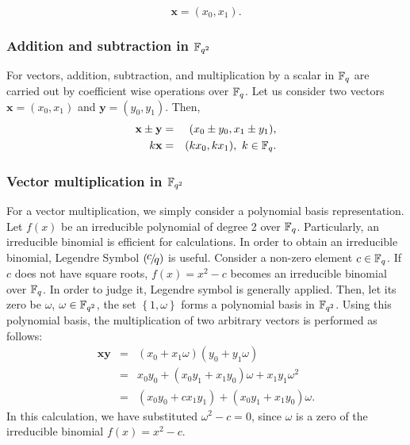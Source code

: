 \begin{equation}\label{eq:vector_reprentation}
\textbf{x} = (x_0,x_1).
\end{equation}

\subsubsection{Addition and subtraction in ${\mathbb{F}}_{q^{2}}$}
For vectors, addition, subtraction, and multiplication by a scalar in ${\mathbb{F}}_{q}$ are carried out by coefficient wise operations over ${\mathbb{F}}_{q}$. Let us consider two vectors $\textbf{x}=(x_0,x_1)$ and $\textbf{y}=(y_0,y_1)$. Then,
\begin{eqnarray}
\textbf{x} \pm \textbf{y} & = &  (x_0 \pm y_0, x_1 \pm y_1), \\
k\textbf{x} & = &  (kx_0,  kx_1),  \mbox{ $k \in {\mathbb{F}}_{q}$}.
\end{eqnarray}
 
\subsubsection{Vector multiplication in ${\mathbb{F}}_{q^{2}}$}
For a vector multiplication, we simply consider a polynomial basis representation. Let  $f(x)$ be an irreducible polynomial of degree 2 over ${\mathbb{F}}_{q}$. Particularly, an irreducible binomial is efficient for calculations. In order to obtain an irreducible binomial, Legendre Symbol $\Leg{c}{q}$ is useful. Consider a non-zero element $c \in {\mathbb{F}}_{q}$. If $c$ does not have square roots, $f(x) =x^2 - c$ becomes an irreducible binomial over ${\mathbb{F}}_{q}$. In order to judge it, Legendre symbol is generally applied. Then, let its zero be $\omega$, $\omega \in {\mathbb{F}}_{q^{2}}$, the set $\left\lbrace 1,\omega \right\rbrace $ forms a polynomial basis in ${\mathbb{F}}_{q^{2}}$. Using this polynomial basis, the multiplication of two arbitrary vectors is performed as follows:
\begin{eqnarray}
\textbf{xy} & = & (x_0+x_1\omega)(y_0+y_1\omega)\nonumber\\
& = & x_0 y_0 + (x_0 y_1+x_1 y_0)\omega +x_1y_1\omega^2 \nonumber \\ 
& = &(x_0 y_0 + c x_1 y_1)+ (x_0 y_1+x_1 y_0)\omega.
\end{eqnarray}
In this calculation, we have substituted $\omega^2 - c = 0$, since $\omega$ is a zero of the irreducible binomial $f(x)=x^2-c$.

